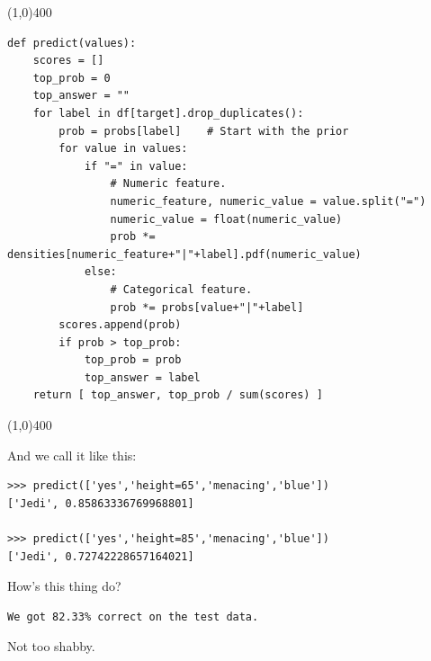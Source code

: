 \documentclass[12pt]{article}
\begin{document}
\footnotesize
\begin{center}
\line(1,0){400}
\end{center}
\begin{Verbatim}[fontsize=\small,samepage=true,frame=none]
def predict(values):
    scores = []
    top_prob = 0
    top_answer = ""
    for label in df[target].drop_duplicates():
        prob = probs[label]    # Start with the prior
        for value in values:
            if "=" in value:
                # Numeric feature.
                numeric_feature, numeric_value = value.split("=")
                numeric_value = float(numeric_value)
                prob *= densities[numeric_feature+"|"+label].pdf(numeric_value)
            else:
                # Categorical feature.
                prob *= probs[value+"|"+label]
        scores.append(prob)
        if prob > top_prob:
            top_prob = prob
            top_answer = label
    return [ top_answer, top_prob / sum(scores) ]
\end{Verbatim}
\begin{center}
\line(1,0){400}
\end{center}
\normalsize

And we call it like this:
\begin{Verbatim}[fontsize=\small,samepage=true,frame=none]
>>> predict(['yes','height=65','menacing','blue'])
['Jedi', 0.85863336769968801]

>>> predict(['yes','height=85','menacing','blue'])
['Jedi', 0.72742228657164021]
\end{Verbatim}

How's this thing do?

\begin{Verbatim}[fontsize=\small,samepage=true,frame=none]
We got 82.33% correct on the test data.
\end{Verbatim}

Not too shabby.
\end{document}
